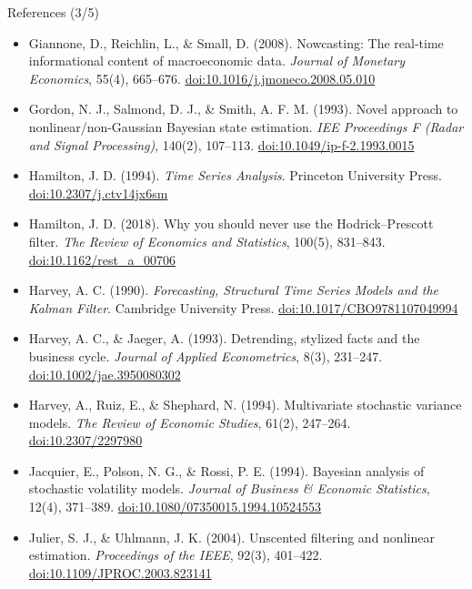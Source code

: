 \begin{frame}{References (3/5)}
\itemsize{\tiny}
\begin{itemize}
    \item Giannone, D., Reichlin, L., \& Small, D. (2008). Nowcasting: The real-time informational content of macroeconomic data. \textit{Journal of Monetary Economics}, 55(4), 665--676. \href{https://doi.org/10.1016/j.jmoneco.2008.05.010}{doi:10.1016/j.jmoneco.2008.05.010}
    \item Gordon, N. J., Salmond, D. J., \& Smith, A. F. M. (1993). Novel approach to nonlinear/non-Gaussian Bayesian state estimation. \textit{IEE Proceedings F (Radar and Signal Processing)}, 140(2), 107--113. \href{https://doi.org/10.1049/ip-f-2.1993.0015}{doi:10.1049/ip-f-2.1993.0015}
    \item Hamilton, J. D. (1994). \textit{Time Series Analysis}. Princeton University Press. \href{https://doi.org/10.2307/j.ctv14jx6sm}{doi:10.2307/j.ctv14jx6sm}
    \item Hamilton, J. D. (2018). Why you should never use the Hodrick--Prescott filter. \textit{The Review of Economics and Statistics}, 100(5), 831--843. \href{https://doi.org/10.1162/rest_a_00706}{doi:10.1162/rest\_a\_00706}
    \item Harvey, A. C. (1990). \textit{Forecasting, Structural Time Series Models and the Kalman Filter}. Cambridge University Press. \href{https://doi.org/10.1017/CBO9781107049994}{doi:10.1017/CBO9781107049994}
    \item Harvey, A. C., \& Jaeger, A. (1993). Detrending, stylized facts and the business cycle. \textit{Journal of Applied Econometrics}, 8(3), 231--247. \href{https://doi.org/10.1002/jae.3950080302}{doi:10.1002/jae.3950080302}
    \item Harvey, A., Ruiz, E., \& Shephard, N. (1994). Multivariate stochastic variance models. \textit{The Review of Economic Studies}, 61(2), 247--264. \href{https://doi.org/10.2307/2297980}{doi:10.2307/2297980}
    \item Jacquier, E., Polson, N. G., \& Rossi, P. E. (1994). Bayesian analysis of stochastic volatility models. \textit{Journal of Business \& Economic Statistics}, 12(4), 371--389. \href{https://doi.org/10.1080/07350015.1994.10524553}{doi:10.1080/07350015.1994.10524553}
    \item Julier, S. J., \& Uhlmann, J. K. (2004). Unscented filtering and nonlinear estimation. \textit{Proceedings of the IEEE}, 92(3), 401--422. \href{https://doi.org/10.1109/JPROC.2003.823141}{doi:10.1109/JPROC.2003.823141}

\end{itemize}
\end{frame}
